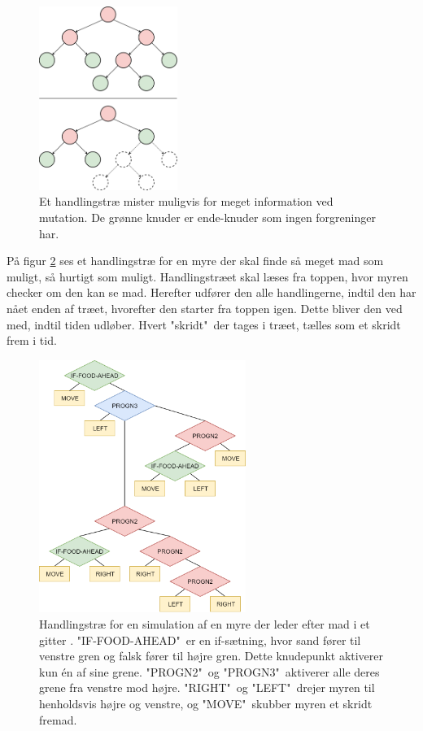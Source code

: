\begin{figure}[H]
    \centering
    \includegraphics[width=0.4\textwidth]{figures/Mutation.png}
    \caption{Et handlingstræ mister muligvis for meget information ved mutation. De grønne knuder er ende-knuder som ingen forgreninger har.}
    \label{Tree_mutation}
\end{figure}
På figur \ref{Ant simulation} ses et handlingstræ for en myre der skal finde så meget mad som muligt, så hurtigt som muligt. Handlingstræet skal læses fra toppen, hvor myren checker om den kan se mad. Herefter udfører den alle handlingerne, indtil den har nået enden af træet, hvorefter den starter fra toppen igen. Dette bliver den ved med, indtil tiden udløber. Hvert "skridt"\ der tages i træet, tælles som et skridt frem i tid.
\begin{figure}[H]
    \centering
    \includegraphics[width=0.6\textwidth]{figures/Ant_simulation.png}
    \caption{Handlingstræ for en simulation af en myre der leder efter mad i et gitter \citep{genetic-algorithms}. "IF-FOOD-AHEAD"\ er en if-sætning, hvor sand fører til venstre gren og falsk fører til højre gren. Dette knudepunkt aktiverer kun én af sine grene. "PROGN2"\ og "PROGN3"\ aktiverer alle deres grene fra venstre mod højre. "RIGHT"\ og "LEFT"\ drejer myren til henholdsvis højre og venstre, og "MOVE"\ skubber myren et skridt fremad.}
    \label{Ant simulation}
\end{figure}
